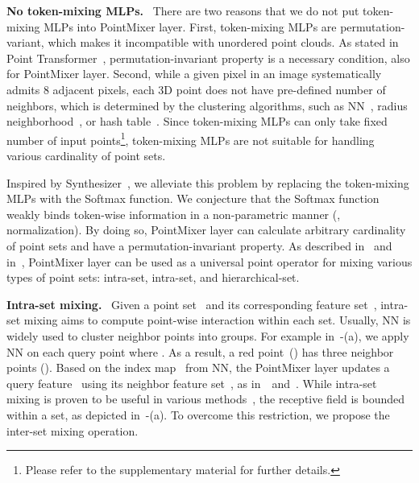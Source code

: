 \begin{comment}
our PointMixer layer can be described as:





\JS{ shit equations. Better to remove it.}
\end{comment} 
\noindent \textbf{No token-mixing MLPs.} \
There are two reasons that we do not put token-mixing MLPs into PointMixer layer.
First, token-mixing MLPs are permutation-variant, which makes it incompatible with unordered point clouds. 
As stated in Point Transformer~\cite{point-transformer}, permutation-invariant property is a necessary condition, also for PointMixer layer. 
Second, while a given pixel in an image systematically admits 8 adjacent pixels, each 3D point does not have pre-defined number of neighbors, which is determined by the clustering algorithms, such as NN~\cite{edgeconv,pointnet++,point-transformer}, radius neighborhood~\cite{kpconv}, or hash table~\cite{mink,point-recon}. 
Since token-mixing MLPs can only take fixed number of input points\footnote{Please refer to the supplementary material for further details.}, token-mixing MLPs are not suitable for handling various cardinality of point sets.




Inspired by Synthesizer~\cite{synthesizer}, we alleviate this problem by replacing the token-mixing MLPs with the Softmax function. We conjecture that the Softmax function weakly binds token-wise information in a non-parametric manner (\ie, normalization). By doing so, PointMixer layer can calculate arbitrary cardinality of point sets and have a permutation-invariant property. 
As described in~\Fref{fig:fig_operator} and in~\Tref{table:compare}, PointMixer layer can be used as a universal point operator for mixing various types of point sets: intra-set, intra-set, and hierarchical-set.


\noindent \textbf{Intra-set mixing.} \
Given a point set~ and its corresponding feature set~, intra-set mixing aims to compute point-wise interaction within each set. 
Usually, NN is widely used to cluster neighbor points into groups. 
For example in~\Fref{fig:fig_operator}-(a), we apply NN on each query point where . As a result, a red point~() has three neighbor points ().
Based on the index map~ from NN, the PointMixer layer updates a query feature~ using its neighbor feature set~, as in~~and~. While intra-set mixing is proven to be useful in various methods~\cite{point-cloud-analysis}, the receptive field is bounded within a set, as depicted in~-(a). To overcome this restriction, we propose the inter-set mixing operation.

